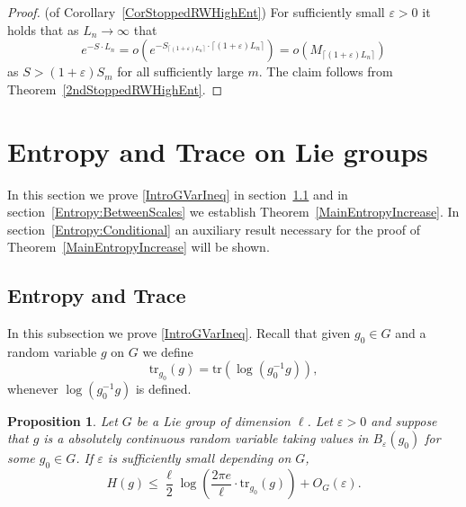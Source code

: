 \documentclass[10pt, english,oneside,reqno]{amsart}
\theoremstyle{plain}
\newtheorem{proposition}[theorem]{Proposition}
\theoremstyle{remark}
\numberwithin{equation}{section}
\numberwithin{figure}{section}
\newcommand{\eps}{\varepsilon}
\newcommand{\tr}{\mathrm{tr}}
\begin{document}
\begin{proof}(of Corollary~\ref{CorStoppedRWHighEnt})
    For sufficiently small $\eps > 0$ it holds that as $L_n \to \infty$ that $$e^{-S\cdot L_n} = o(e^{-S_{\lceil (1 + \eps)L_n \rceil} \cdot \lceil (1 + \eps)L_n \rceil}) = o(M_{\lceil (1 + \eps)L_n \rceil})$$ as $S > (1 + \eps) S_{m}$ for all sufficiently large $m$. The claim follows from Theorem~\ref{2ndStoppedRWHighEnt}. 
\end{proof}




    \section{Entropy and Trace on Lie groups}   \label{EntropyTraceSection}


In this section we prove \eqref{IntroGVarIneq} in section~\ref{Entropy:EntTraceComp}  and in section~\ref{Entropy:BetweenScales} we establish Theorem~\ref{MainEntropyIncrease}. In section~\ref{Entropy:Conditional} an auxiliary result necessary for the proof of Theorem~\ref{MainEntropyIncrease}  will be shown.


\subsection{Entropy and Trace} \label{Entropy:EntTraceComp}

In this subsection we prove \eqref{IntroGVarIneq}. Recall that given $g_0 \in G$ and a random variable $g$ on $G$ we define $$\mathrm{tr}_{g_0}(g) = \mathrm{tr}(\log(g_0^{-1}g)),$$ whenever $\log(g_0^{-1}g)$ is defined.

\begin{proposition}\label{GVarianceEntIneq}
    Let $G$ be a Lie group of dimension $\ell$. Let $\eps > 0$ and suppose that $g$ is a absolutely continuous random variable taking values in  $B_{\eps}(g_0)$ for some $g_0 \in G$. If $\eps$ is sufficiently small depending on $G$, $$H(g) \leq \frac{\ell}{2} \log\left(  \frac{2\pi e}{\ell} \cdot \tr_{g_0}(g) \right) + O_G(\eps).$$
\end{proposition}
\end{document}
